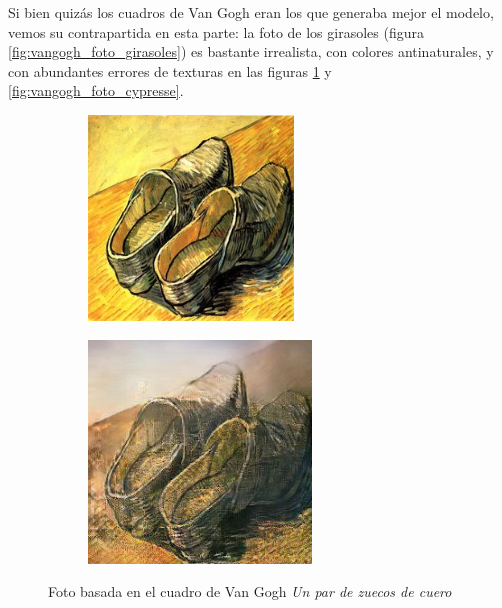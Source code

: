 \documentclass[[../main.tex]{subfiles}
\begin{document}
Si bien quizás los cuadros de Van Gogh eran los que generaba mejor el modelo, vemos su contrapartida en esta parte: la foto de los girasoles (figura \ref{fig:vangogh_foto_girasoles}) es bastante irrealista, con colores antinaturales, y con abundantes errores de texturas en las figuras \ref{fig:vangogh_foto_zuecos} y \ref{fig:vangogh_foto_cypresse}.

        \begin{figure}[!htb]
            \begin{subfigure}[b]{0.49\textwidth}
            \includegraphics[width=0.6\textwidth]{imagenes/cuadro2imagen/vangogh/00002_2.jpg}
            \end{subfigure}
        \hfill
            \begin{subfigure}[b]{0.49\textwidth}
            \includegraphics[width=0.65\textwidth]{imagenes/cuadro2imagen/vangogh/00002.jpg}
            \end{subfigure}
        \caption{Foto basada en el cuadro de Van Gogh \textit{Un par de zuecos de cuero}}
        \label{fig:vangogh_foto_zuecos}
        \end{figure}
        
\end{document}
